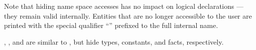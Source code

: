 \begin{isabellebody}
\begin{isamarkuptext}
\begin{description}
  Note that hiding name space accesses has no impact on logical
  declarations --- they remain valid internally.  Entities that are no
  longer accessible to the user are printed with the special qualifier
  ``\isa{{\isachardoublequote}{\isacharquery}{\isacharquery}{\isachardoublequote}}'' prefixed to the full internal name.

  \item \hyperlink{command.hide-type}{\mbox{}}, \hyperlink{command.hide-const}{\mbox{}}, and \hyperlink{command.hide-fact}{\mbox{}} are similar to \hyperlink{command.hide-class}{\mbox{}}, but hide types,
  constants, and facts, respectively.
  
  \end{description}%
\end{isamarkuptext}%
\isamarkuptrue%
%
\isadelimtheory
%
\endisadelimtheory
%
\isatagtheory
{}\isamarkupfalse%
%
\endisatagtheory
{\isafoldtheory}%
%
\isadelimtheory
%
\endisadelimtheory
\isanewline
\end{isabellebody}%
